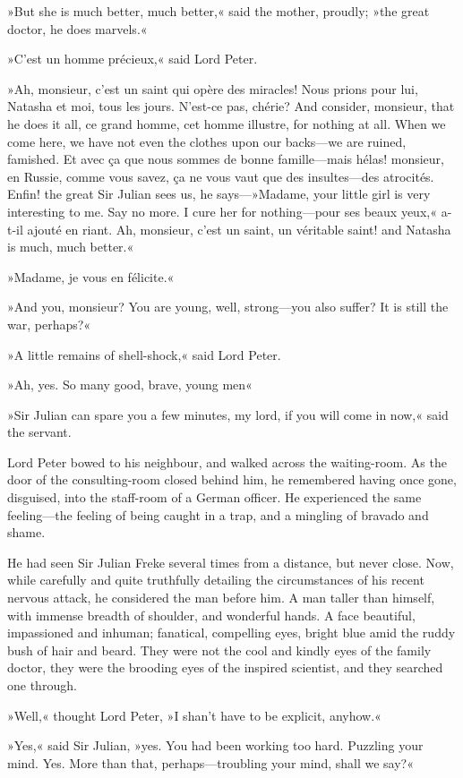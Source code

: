 »But she is much better, much better,« said the mother, proudly; »the great doctor, he does marvels.«

»C'est un homme précieux,« said Lord Peter.

»Ah, monsieur, c'est un saint qui opère des miracles! Nous prions pour lui, Natasha et moi, tous les jours. N'est-ce pas, chérie? And consider, monsieur, that he does it all, ce grand homme, cet homme illustre, for nothing at all. When we come here, we have not even the clothes upon our backs—we are ruined, famished. Et avec ça que nous sommes de bonne famille—mais hélas! monsieur, en Russie, comme vous savez, ça ne vous vaut que des insultes—des atrocités. Enfin! the great Sir Julian sees us, he says---»Madame, your little girl is very interesting to me. Say no more. I cure her for nothing—pour ses beaux yeux,« a-t-il ajouté en riant. Ah, monsieur, c'est un saint, un véritable saint! and Natasha is much, much better.«

»Madame, je vous en félicite.«

»And you, monsieur? You are young, well, strong—you also suffer? It is still the war, perhaps?«

»A little remains of shell-shock,« said Lord Peter.

»Ah, yes. So many good, brave, young men\longdash«

»Sir Julian can spare you a few minutes, my lord, if you will come in now,« said the servant.

Lord Peter bowed to his neighbour, and walked across the waiting-room. As the door of the consulting-room closed behind him, he remembered having once gone, disguised, into the staff-room of a German officer. He experienced the same feeling—the feeling of being caught in a trap, and a mingling of bravado and shame.

He had seen Sir Julian Freke several times from a distance, but never close. Now, while carefully and quite truthfully detailing the circumstances of his recent nervous attack, he considered the man before him. A man taller than himself, with immense breadth of shoulder, and wonderful hands. A face beautiful, impassioned and inhuman; fanatical, compelling eyes, bright blue amid the ruddy bush of hair and beard. They were not the cool and kindly eyes of the family doctor, they were the brooding eyes of the inspired scientist, and they searched one through.

»Well,« thought Lord Peter, »I shan't have to be explicit, anyhow.«

»Yes,« said Sir Julian, »yes. You had been working too hard. Puzzling your mind. Yes. More than that, perhaps—troubling your mind, shall we say?«

